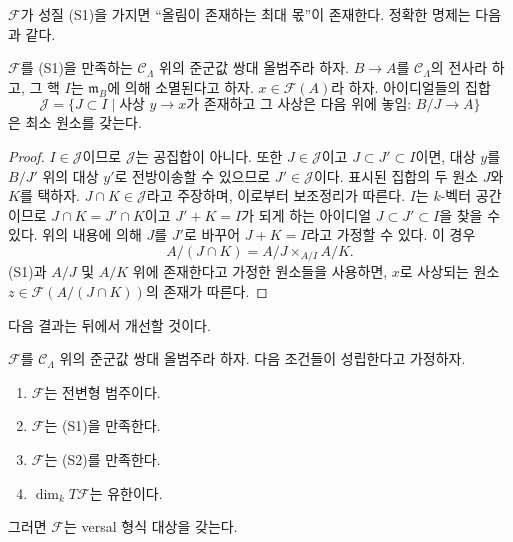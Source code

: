 \noindent
$\mathcal{F}$가 성질 (S1)을 가지면 “올림이 존재하는 최대 몫”이
존재한다. 정확한 명제는 다음과 같다.

\begin{lemma}
\label{lemma-largest-closed-where-lift}
$\mathcal{F}$를 (S1)을 만족하는
$\mathcal{C}_\Lambda$ 위의 준군값 쌍대 올범주라 하자.
$B \to A$를 $\mathcal{C}_\Lambda$의 전사라 하고, 그 핵 $I$는
$\mathfrak m_B$에 의해 소멸된다고 하자.
$x \in \mathcal{F}(A)$라 하자. 아이디얼들의 집합
$$
\mathcal{J} = \{ J \subset I \mid
\text{사상 }y \to x\text{가 존재하고 그 사상은 다음 위에 놓임: }B/J \to A\}
$$
은 최소 원소를 갖는다.
\end{lemma}

\begin{proof}
$I \in \mathcal{J}$이므로 $\mathcal{J}$는 공집합이 아니다.
또한 $J \in \mathcal{J}$이고 $J \subset J' \subset I$이면,
대상 $y$를 $B/J'$ 위의 대상 $y'$로 전방이송할 수 있으므로
$J' \in \mathcal{J}$이다. 표시된 집합의 두 원소 $J$와 $K$를
택하자. $J \cap K \in \mathcal{J}$라고 주장하며, 이로부터
보조정리가 따른다. $I$는 $k$-벡터 공간이므로
$J \cap K = J' \cap K$이고 $J' + K = I$가 되게 하는 아이디얼
$J \subset J' \subset I$을 찾을 수 있다. 위의 내용에 의해
$J$를 $J'$로 바꾸어 $J + K = I$라고 가정할 수 있다.
이 경우
$$
A/(J \cap K) = A/J \times_{A/I} A/K.
$$
(S1)과 $A/J$ 및 $A/K$ 위에 존재한다고 가정한 원소들을 사용하면,
$x$로 사상되는 원소 $z \in \mathcal{F}(A/(J \cap K))$의
존재가 따른다.
\end{proof}

\noindent
다음 결과는 뒤에서 개선할 것이다.

\begin{lemma}
\label{lemma-versal-object-existence}
$\mathcal{F}$를 $\mathcal{C}_\Lambda$ 위의 준군값 쌍대 올범주라 하자.
다음 조건들이 성립한다고 가정하자.
\begin{enumerate}
\item $\mathcal{F}$는 전변형 범주이다.
\item $\mathcal{F}$는 (S1)을 만족한다.
\item $\mathcal{F}$는 (S2)를 만족한다.
\item $\dim_k T\mathcal{F}$는 유한이다.
\end{enumerate}
그러면 $\mathcal{F}$는 versal 형식 대상을 갖는다.
\end{lemma}


